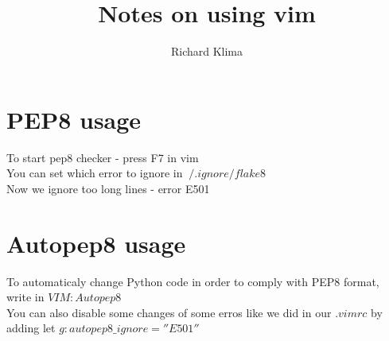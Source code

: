 \documentclass[a4paper]{article}
\title{Notes on using vim}
\author{Richard Klima}
\begin{document}
\maketitle
\section{PEP8 usage}
To start pep8 checker - press F7 in vim\\
You can set which error to ignore in $~/.ignore/flake8$\\
Now we ignore too long lines - error E501

\section{Autopep8 usage}
To automaticaly change Python code in order to comply with PEP8 format, write in $VIM :Autopep8$\\
You can also disable some changes of some erros like we did in our $.vimrc$ by adding let $g:autopep8\_ignore=''E501''$  

\end{document}

